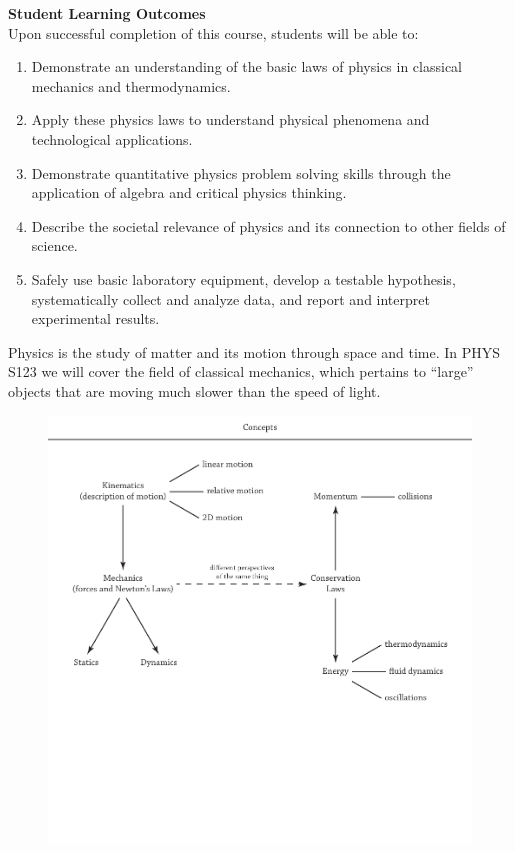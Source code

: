 \documentclass[11pt,letterpaper]{article}
\begin{document}
\textbf{Student Learning Outcomes}\\
Upon successful completion of this course, students will be able to:
\begin{enumerate}\itemsep -5pt
\item Demonstrate an understanding of the basic laws of physics in classical mechanics and thermodynamics.
\item Apply these physics laws to understand physical phenomena and technological applications.
\item Demonstrate quantitative physics problem solving skills through the application of algebra and critical physics thinking.
\item Describe the societal relevance of physics and its connection to other fields of science.
\item Safely use basic laboratory equipment, develop a testable hypothesis, systematically collect and analyze data, and report and interpret experimental results.
\end{enumerate}\bigskip

Physics is the study of matter and its motion through space and time. In PHYS S123 we will cover the field of classical mechanics, which pertains to ``large'' objects that are moving much slower than the speed of light.


\begin{figure}[h]
\begin{center}
\includegraphics[width=6.5in, trim={0 2in 0 0}, clip]{./flowchart.pdf}
\end{center}
\end{figure}
\end{document}
